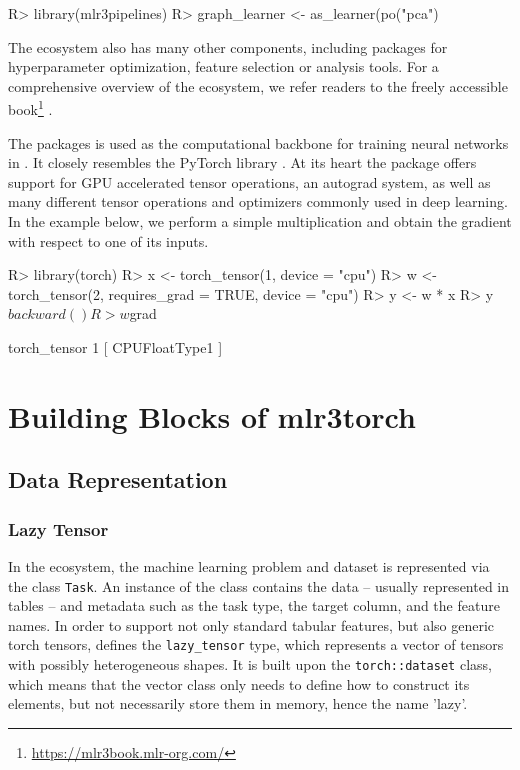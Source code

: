 \documentclass[article, nojss]{jss}
\theoremstyle{definition}
\begin{document}
\begin{CodeInput}
R> library(mlr3pipelines)
R> graph_learner <- as_learner(po("pca") %
\end{CodeInput}

The  ecosystem also has many other components, including packages for hyperparameter optimization, feature selection or analysis tools.
For a comprehensive overview of the  ecosystem, we refer readers to the freely accessible book\footnote{\url{https://mlr3book.mlr-org.com/}} \citep{ref-mlr3book}.

The  packages is used as the computational backbone for training neural networks in .
It closely resembles the PyTorch \python{} library \citep{ref-pytorch}.
At its heart the package offers support for GPU accelerated tensor operations, an autograd system, as well as many different tensor operations and optimizers commonly used in deep learning.
In the example below, we perform a simple multiplication and obtain the gradient with respect to one of its inputs.

\begin{CodeInput}
R> library(torch)
R> x <- torch_tensor(1, device = "cpu")
R> w <- torch_tensor(2, requires_grad = TRUE, device = "cpu")
R> y <- w * x
R> y$backward()
R> w$grad
\end{CodeInput}
\begin{CodeOutput}
torch_tensor
 1
[ CPUFloatType{1} ]
\end{CodeOutput}

\section{Building Blocks of mlr3torch}\label{sec:building-blocks}

\subsection{Data Representation}

\subsubsection{Lazy Tensor}

In the  ecosystem, the machine learning problem and dataset is represented via the  class \texttt{Task}.
An instance of the class contains the data -- usually represented in tables -- and metadata such as the task type, the target column, and the feature names.
In order to support not only standard tabular features, but also generic torch tensors,  defines the \texttt{lazy\_tensor} type, which represents a vector of tensors with possibly heterogeneous shapes.
It is built upon the \texttt{torch::dataset} class, which means that the vector class only needs to define how to construct its elements, but not necessarily store them in memory, hence the name 'lazy'.
\end{document}
